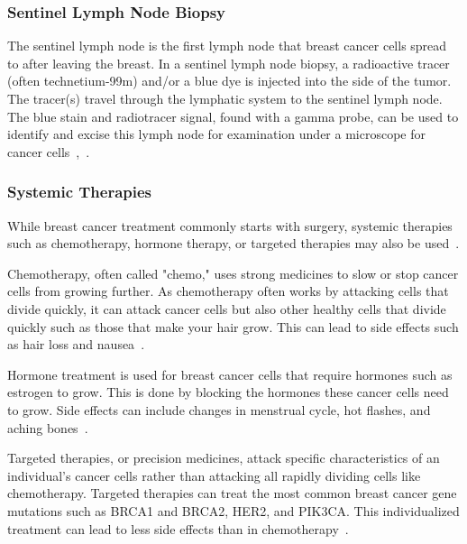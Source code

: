 \subsubsection*{Sentinel Lymph Node Biopsy\label{sec:introduction:breastcancer:currenttreatmentoptions:sentinellymphnodebiopsy}}
The sentinel lymph node is the first lymph node that breast cancer cells spread to after leaving the breast. In a sentinel lymph node biopsy, a radioactive tracer (often technetium-99m) and/or a blue dye is injected into the side of the tumor. The tracer(s) travel through the lymphatic system to the sentinel lymph node. The blue stain and radiotracer signal, found with a gamma probe, can be used to identify and excise this lymph node for examination under a microscope for cancer cells~\cite{RefWorks:RefID:37-memorialsurgery},~\cite{RefWorks:RefID:165-czajka2023breast}.

\subsubsection*{Systemic Therapies\label{sec:introduction:breastcancer:currenttreatmentoptions:systemictherapies}}
While breast cancer treatment commonly starts with surgery, systemic therapies such as chemotherapy, hormone therapy, or targeted therapies may also be used~\cite{RefWorks:RefID:37-memorialsurgery}.

Chemotherapy, often called "chemo," uses strong medicines to slow or stop cancer cells from growing further. As chemotherapy often works by attacking cells that divide quickly, it can attack cancer cells but also other healthy cells that divide quickly such as those that make your hair grow. This can lead to side effects such as hair loss and nausea~\cite{RefWorks:RefID:37-memorialsurgery}.

Hormone treatment is used for breast cancer cells that require hormones such as estrogen to grow. This is done by blocking the hormones these cancer cells need to grow. Side effects can include changes in menstrual cycle, hot flashes, and aching bones~\cite{RefWorks:RefID:37-memorialsurgery}.

Targeted therapies, or precision medicines, attack specific characteristics of an individual's cancer cells rather than attacking all rapidly dividing cells like chemotherapy. Targeted therapies can treat the most common breast cancer gene mutations such as BRCA1 and BRCA2, HER2, and PIK3CA. This individualized treatment can lead to less side effects than in chemotherapy~\cite{RefWorks:RefID:37-memorialsurgery}.

